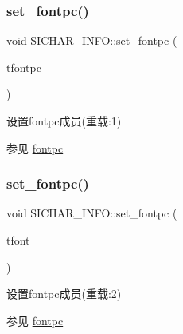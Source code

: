 \subsubsection{\texorpdfstring{set\+\_\+fontpc()}{set\_fontpc()}\hspace{0.1cm}{\footnotesize\ttfamily [1/2]}}
{\footnotesize\ttfamily void S\+I\+C\+H\+A\+R\+\_\+\+I\+N\+F\+O\+::set\+\_\+fontpc (\begin{DoxyParamCaption}\item[{S\+I\+F\+O\+N\+T\+\_\+P}]{tfontpc }\end{DoxyParamCaption})\hspace{0.3cm}{\ttfamily [inline]}}



设置fontpc成员(重载\+:1) 

\begin{DoxySeeAlso}{参见}
\hyperlink{class_s_i_c_h_a_r___i_n_f_o_a8d998c494943882d98981f79f620460d}{fontpc} 
\end{DoxySeeAlso}
\mbox{\label{class_s_i_c_h_a_r___i_n_f_o_a01ad1057400db3ccec680de26f4ab0a2}} 
\subsubsection{\texorpdfstring{set\+\_\+fontpc()}{set\_fontpc()}\hspace{0.1cm}{\footnotesize\ttfamily [2/2]}}
{\footnotesize\ttfamily void S\+I\+C\+H\+A\+R\+\_\+\+I\+N\+F\+O\+::set\+\_\+fontpc (\begin{DoxyParamCaption}\item[{S\+I\+F\+O\+NT \&}]{tfont }\end{DoxyParamCaption})\hspace{0.3cm}{\ttfamily [inline]}}



设置fontpc成员(重载\+:2) 

\begin{DoxySeeAlso}{参见}
\hyperlink{class_s_i_c_h_a_r___i_n_f_o_a8d998c494943882d98981f79f620460d}{fontpc} 
\end{DoxySeeAlso}
\mbox{\label{class_s_i_c_h_a_r___i_n_f_o_af38e1eac74e8d9c14e5c5d05d58f8b36}} 
